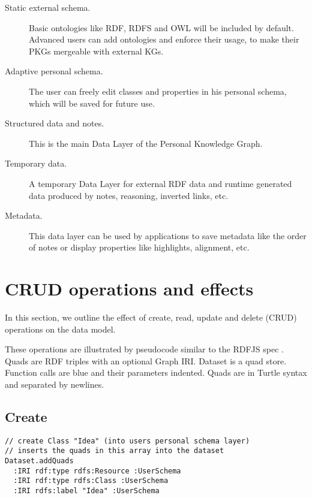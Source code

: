 \begin{description}
  \item[Static external schema.] Basic ontologies like RDF, RDFS and OWL will be included by default. Advanced users can add ontologies and enforce their usage, to make their PKGs mergeable with external KGs.

  \item[Adaptive personal schema.] The user can freely edit classes and properties in his personal schema, which will be saved for future use.

  \item[Structured data and notes.] This is the main Data Layer of the Personal Knowledge Graph.

  \item[Temporary data.] A temporary Data Layer for external RDF data and runtime generated data produced by notes, reasoning, inverted links, etc.

  \item[Metadata.] This data layer can be used by applications to save metadata like the order of notes or display properties like highlights, alignment, etc.
\end{description}






\section{CRUD operations and effects}

In this section, we outline the effect of create, read, update and delete (CRUD) operations on the data model.

These operations are illustrated by pseudocode similar to the RDFJS spec \cite{rdfjs}. Quads are RDF triples with an optional Graph IRI. Dataset is a quad store. Function calls are blue and their parameters indented. Quads are in Turtle syntax and separated by newlines.

\subsection*{Create}

\begin{lstlisting}
// create Class "Idea" (into users personal schema layer)
// inserts the quads in this array into the dataset
Dataset.addQuads
  :IRI rdf:type rdfs:Resource :UserSchema
  :IRI rdf:type rdfs:Class :UserSchema
  :IRI rdfs:label "Idea" :UserSchema
\end{lstlisting}

